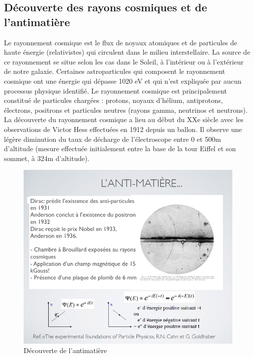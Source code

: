 \subsection{Découverte des rayons cosmiques et de l'antimatière}
Le rayonnement cosmique est le flux de noyaux atomiques et de particules de haute énergie (relativistes) qui circulent dans le milieu interstellaire. La source de ce rayonnement se situe selon les cas dans le Soleil, à l'intérieur ou à l'extérieur de notre galaxie. Certaines astroparticules qui composent le rayonnement cosmique ont une énergie qui dépasse 1020 eV et qui n'est expliquée par aucun processus physique identifié. Le rayonnement cosmique est principalement constitué de particules chargées : protons, noyaux d'hélium, antiprotons, électrons, positrons et particules neutres (rayons gamma, neutrinos et neutrons).\\[0,2cm]
La découverte du rayonnement cosmique a lieu au début du XXe siècle avec les observations de Victor Hess effectuées en 1912 depuis un ballon. Il observe une légère diminution du taux de décharge de l'électroscope entre 0 et 500m d'altitude (mesure effectuée initialement entre la base de la tour Eiffel et son sommet, à 324m d'altitude).

\begin{figure}[ht]
    \centering
    \includegraphics[scale=0.80]{Images1/antimatiere.PNG}
    \caption{Découverte de l'antimatière}
\end{figure}
\newpage
